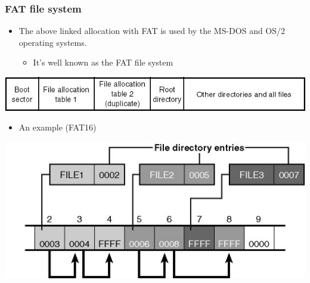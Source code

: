 \documentclass[CJKutf8,xcolor=pdftex,dvipsnames,table]{beamer}
\begin{document}
\begin{CJK*}{UTF8}{song}
  \begin{frame}
    \frametitle{FAT file system} \pause
    \begin{itemize}\parskip=0pt
    \item The above linked allocation with FAT is used by the MS-DOS and OS/2 operating systems. \pause
      \begin{itemize}\parskip=0pt
      \item It's well known as the FAT file system \pause
      \end{itemize}
    \end{itemize}
    \begin{center}
      \includegraphics[scale=0.4]{fat} \pause
    \end{center}
    \begin{itemize}\parskip=0pt
    \item An example (FAT16) \pause
    \end{itemize}
    \begin{center}
      \includegraphics[scale=0.4]{fateg}
    \end{center}
  \end{frame}
  

\end{CJK*}
\end{document}
